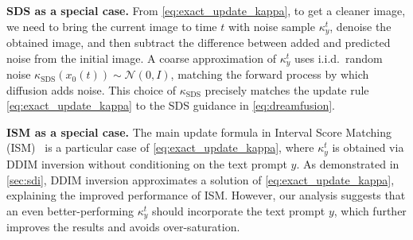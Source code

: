 \textbf{SDS as a special case.} 
From \cref{eq:exact_update_kappa}, to get a cleaner image, we need to bring the 
current image to time $t$ with noise sample $\kappa^t_y$, 
denoise the obtained image, and then subtract the difference between added 
and predicted noise from the initial image.
%
A coarse approximation of $\kappa^t_y$ uses i.i.d.\ random noise 
$\kappa_{\textrm{SDS}}(x_0(t)) \sim \mathcal{N}(0, I)$, matching the forward process by which diffusion adds noise. This choice of $\kappa_{\textrm{SDS}}$ precisely matches the update rule \cref{eq:exact_update_kappa} to the SDS guidance in \cref{eq:dreamfusion}.

\textbf{ISM as a special case.}
The main update formula in Interval Score Matching (ISM)~\cite{liang2023luciddreamer} is a particular case of \cref{eq:exact_update_kappa}, where $\kappa^t_y$ is obtained via DDIM inversion without conditioning on the text prompt $y$.
As demonstrated in \cref{sec:sdi}, DDIM inversion approximates a solution of \cref{eq:exact_update_kappa}, explaining the improved performance of ISM.
However, our analysis suggests that an even better-performing $\kappa^t_y$ should incorporate the text prompt $y$, which further improves the results and avoids over-saturation.

 